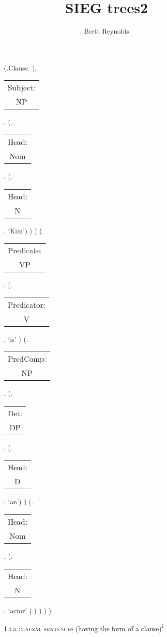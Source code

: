 \documentclass[12pt,letterpaper]{article}
\author{Brett Reynolds}
\title{SIEG trees2}
\begin{document}
	
	\begin{figure}
		\begin{center}
			\begin{parsetree}
				(.Clause.
				(.\begin{tabular}{c}Subject:\\NP\end{tabular}.  
				(.\begin{tabular}{c}Head:\\Nom\end{tabular}.
				(.\begin{tabular}{c}Head:\\N\end{tabular}. `Kim')
				)
				)
				(.\begin{tabular}{c}Predicate:\\VP\end{tabular}.
				(.\begin{tabular}{c}Predicator:\\V\end{tabular}.    `is' )
				(.\begin{tabular}{c}PredComp:\\NP\end{tabular}. 
					(.\begin{tabular}{c}Det:\\DP\end{tabular}. 
						(.\begin{tabular}{c}Head:\\D\end{tabular}.  `an')
					)
				(.\begin{tabular}{c}Head:\\Nom\end{tabular}.  
				(.\begin{tabular}{c}Head:\\N\end{tabular}.    `actor' )
				)
				)
				)
				)
				
				\hfill \break\hfill \break
			\end{parsetree}
			1.i.a \textsc{clausal sentences} (having the form of a clause)\textsuperscript{i}
		\end{center}
	\end{figure}
	
\end{document}
